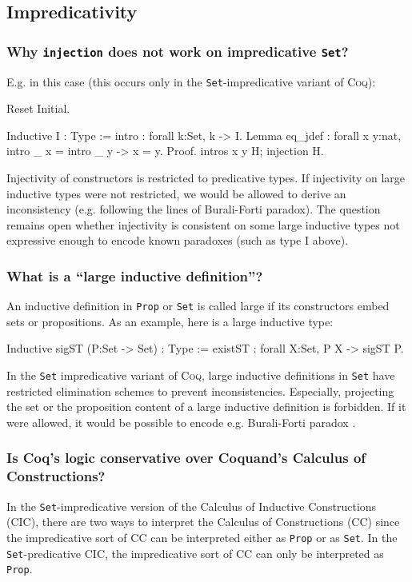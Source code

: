 \documentclass[a4paper,pdftex]{article}
\def\Question#1{\stepcounter{question}\subsubsection{#1}}
\def\Coq{\textsc{Coq}}
\def\Prop{{\tt Prop}}
\def\Set{{\tt Set}}
\begin{document}
\subsection{Impredicativity}

\Question{Why {\tt injection} does not work on impredicative {\tt Set}?}

 E.g. in this case (this occurs only in the {\tt Set}-impredicative
 variant of \Coq):

\begin{coq_eval}
Reset Initial.
\end{coq_eval}

\begin{coq_example*}
Inductive I : Type :=
  intro : forall k:Set, k -> I.
Lemma eq_jdef : 
   forall x y:nat, intro _ x = intro _ y -> x = y.
Proof.
   intros x y H; injection H.
\end{coq_example*}

 Injectivity of constructors is restricted to predicative types. If
injectivity on large inductive types were not restricted, we would be
allowed to derive an inconsistency (e.g. following the lines of
Burali-Forti paradox). The question remains open whether injectivity
is consistent on some large inductive types not expressive enough to
encode known paradoxes (such as type I above).


\Question{What is a ``large inductive definition''?}

An inductive definition in {\Prop} or {\Set} is called large
if its constructors embed sets or propositions. As an example, here is
a large inductive type:

\begin{coq_example*}
Inductive sigST (P:Set -> Set) : Type :=
  existST : forall X:Set, P X -> sigST P.
\end{coq_example*}

In the {\tt Set} impredicative variant of {\Coq}, large inductive
definitions in {\tt Set} have restricted elimination schemes to
prevent inconsistencies. Especially, projecting the set or the
proposition content of a large inductive definition is forbidden. If
it were allowed, it would be possible to encode e.g. Burali-Forti
paradox \cite{Gir70,Coq85}.


\Question{Is Coq's logic conservative over Coquand's Calculus of 
Constructions?}

In the {\Set}-impredicative version of the Calculus of Inductive
Constructions (CIC), there are two ways to interpret the Calculus of
Constructions (CC) since the impredicative sort of CC can be
interpreted either as {\Prop} or as {\Set}. In the {\Set}-predicative
CIC, the impredicative sort of CC can only be interpreted as {\Prop}.
\end{document}
